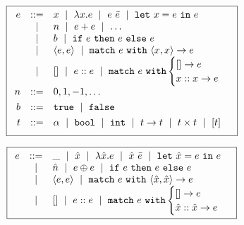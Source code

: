 \begin{figure}
\small
\centering
  \begin{minipage}[c]{\linewidth}
  \[
  \boxed{
  \begin{array}{rcl}
  e & ::=    & x \ \mid\  \lambda x. e \ \mid\  e\ \bar{e} \ \mid\  \mathtt{let}\ x = e\ \mathtt{in}\ e \\
    & \ \mid\  & n \ \mid\  e + e \ \mid\  \ldots \\
    & \ \mid\  & b \ \mid\  \mathtt{if}\ e\ \mathtt{then}\ e\ \mathtt{else}\ e \\
    & \ \mid\  & \langle e, e \rangle \ \mid\  \mathtt{match}\ e\ \mathtt{with}\ \langle x, x \rangle \to e \\
    & \ \mid\  & \mathtt{[]} \ \mid\  e :: e \ \mid\  \mathtt{match}\ e\ \mathtt{with} \begin{cases} \mathtt{[]} \to e\\ x :: x \to e \end{cases} \\[0.05in]

  n & ::= &  0, 1, -1, \ldots \\[0.05in]

  b & ::= &  \mathtt{true} \ \mid\  \mathtt{false} \\[0.05in]

  t & ::= & \alpha \ \mid\  \mathtt{bool} \ \mid\  \mathtt{int} \ \mid\  t \to t \ \mid\  t \times t \ \mid\  [t] \\[0.05in]
  \end{array}
  }
  \]
  \label{fig:ml-syntax}
  \end{minipage}
  \begin{minipage}[c]{\linewidth}
    \[
    \boxed{
    \begin{array}{rcl}
    e & ::=    & \_  \ \mid\  \hat{x} \ \mid\  \lambda \hat{x}. e \ \mid\  \hat{x}\ \bar{e} \ \mid\  \mathtt{let}\ \hat{x} = e\ \mathtt{in}\ e \\
      & \ \mid\  & \hat{n} \ \mid\  e \oplus e \ \mid\  \mathtt{if}\ e\ \mathtt{then}\ e\ \mathtt{else}\ e \\
      & \ \mid\  & \langle e, e \rangle \ \mid\  \mathtt{match}\ e\ \mathtt{with}\ \langle \hat{x}, \hat{x} \rangle \to e \\
      & \ \mid\  & \mathtt{[]} \ \mid\  e :: e \ \mid\  \mathtt{match}\ e\ \mathtt{with} \begin{cases} \mathtt{[]} \to e\\ \hat{x} :: \hat{x} \to e \end{cases} \\[0.05in]
    \end{array}
    }
    \]
    \label{fig:rtl-syntax}
  \end{minipage}
\end{figure}
